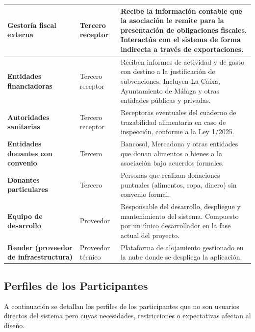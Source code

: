 \begin{longtable}[]{@{}
        p{}
        p{}
        p{}@{}}
    \textbf{Gestoría fiscal externa} & Tercero receptor & Recibe la
    información contable que la asociación le remite para la presentación de
    obligaciones fiscales. Interactúa con el sistema de forma indirecta a
    través de exportaciones. \\
    \midrule

    \textbf{Entidades financiadoras} & Tercero receptor & Reciben informes
    de actividad y de gasto con destino a la justificación de subvenciones.
    Incluyen La Caixa, Ayuntamiento de Málaga y otras entidades públicas y
    privadas. \\
    \midrule

    \textbf{Autoridades sanitarias} & Tercero receptor & Receptoras
    eventuales del cuaderno de trazabilidad alimentaria en caso de
    inspección, conforme a la Ley 1/2025. \\
    \midrule
    
    \textbf{Entidades donantes con convenio} & Tercero & Bancosol, Mercadona
    y otras entidades que donan alimentos o bienes a la asociación bajo
    acuerdos formales. \\
    \midrule

    \textbf{Donantes particulares} & Tercero & Personas que
    realizan donaciones puntuales (alimentos, ropa, dinero) sin convenio
    formal. \\
    \midrule

    \textbf{Equipo de desarrollo} & Proveedor & Responsable del desarrollo,
    despliegue y mantenimiento del sistema. Compuesto por un único
    desarrollador en la fase actual del proyecto. \\
    \midrule
    
    \textbf{Render (proveedor de infraestructura)} & Proveedor técnico &
    Plataforma de alojamiento gestionado en la nube donde se despliega la
    aplicación. \\
\end{longtable}

\newpage

\subsection{Perfiles de los Participantes}
A continuación se detallan los perfiles de los participantes que no son
usuarios directos del sistema pero cuyas necesidades, restricciones o
expectativas afectan al diseño.

